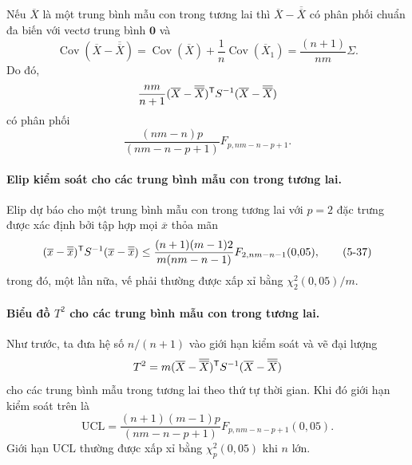 Nếu $\overline{X}$ là một trung bình mẫu con trong tương lai thì $\overline{X}-\overline{\overline{X}}$ có phân phối chuẩn đa biến với vectơ trung bình $\mathbf{0}$ và
\begin{equation*}
    \operatorname{Cov}(\overline{X}-\overline{\overline{X}}) = \operatorname{Cov}(\overline{X}) + \frac{1}{n}\operatorname{Cov}(\overline{X}_{1}) = \frac{(n+1)}{nm}\Sigma.
\end{equation*}
Do đó,
\begin{equation*}
    \frac{nm}{n+1}(\overline{X}-\overline{\overline{X}})^{\mathsf T} S^{-1}(\overline{X}-\overline{\overline{X}})
\end{equation*}
có phân phối
\begin{equation*}
    \frac{(nm-n)p}{(nm-n-p+1)}F_{p, nm-n-p+1}.
\end{equation*}

\paragraph{Elip kiểm soát cho các trung bình mẫu con trong tương lai.} Elip dự báo cho một trung bình mẫu con trong tương lai với $p=2$ đặc trưng được xác định bởi tập hợp mọi $\overline{x}$ thỏa mãn
\begin{equation}
    (\overline{x}-\overline{\overline{x}})^{\mathsf T} S^{-1}(\overline{x}-\overline{\overline{x}}) \le \frac{(n+1)(m-1)2}{m(nm-n-1)}F_{2, nm-n-1}(0{,}05),
    \tag{5-37}
    \label{eq:5-37}
\end{equation}
trong đó, một lần nữa, vế phải thường được xấp xỉ bằng $\chi_{2}^{2}(0{,}05)/m$.

\paragraph{Biểu đồ $T^{2}$ cho các trung bình mẫu con trong tương lai.} Như trước, ta đưa hệ số $n/(n+1)$ vào giới hạn kiểm soát và vẽ đại lượng
\begin{equation*}
    T^{2} = m(\overline{X}-\overline{\overline{X}})^{\mathsf T} S^{-1}(\overline{X}-\overline{\overline{X}})
\end{equation*}
cho các trung bình mẫu trong tương lai theo thứ tự thời gian. Khi đó giới hạn kiểm soát trên là
\begin{equation*}
    \mathrm{UCL} = \frac{(n+1)(m-1)p}{(nm-n-p+1)}F_{p, nm-n-p+1}(0{,}05).
\end{equation*}
Giới hạn $\mathrm{UCL}$ thường được xấp xỉ bằng $\chi_{p}^{2}(0{,}05)$ khi $n$ lớn.

